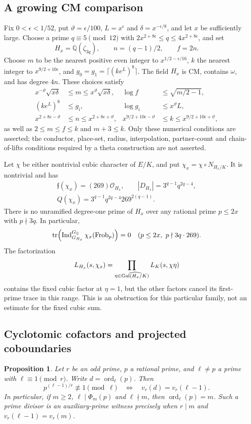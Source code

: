 \documentclass[11pt]{article}
\newtheorem{proposition}[theorem]{Proposition}
\theoremstyle{remark}\newtheorem{remark}[theorem]{Remark}
\newcommand{\Q}{\mathbb Q}\newcommand{\Z}{\mathbb Z}\newcommand{\C}{\mathbb C}
\begin{document}
\subsection*{A growing CM comparison}
Fix $0<\epsilon<1/52$, put $\vartheta=\epsilon/100$,
$L=x^\epsilon$ and $\delta=x^{-\epsilon/8}$, and let $x$ be
sufficiently large. Choose a prime
$q\equiv5\pmod {12}$ with
$2x^{2+8\epsilon}\le q\le4x^{2+8\epsilon}$, and set
\[
 H_x=\Q(\zeta_{3q}),\qquad n=(q-1)/2,\qquad f=2n.
\]
Choose $m$ to be the nearest positive even integer to
$x^{1/2-\epsilon/16}$, $k$ the nearest integer to
$x^{9/2+10\epsilon}$, and $g_0=g_1=\lceil(ke^L)^8\rceil$.
The field $H_x$ is CM, contains $\omega$, and has degree $4n$.
These choices satisfy
\begin{align*}
 x^{-\vartheta}\sqrt{x\delta}&\le m\le x^\vartheta\sqrt{x\delta},&
 \log f&\le\sqrt{m/2-1},\\
 (ke^L)^8&\le g_i,&\log g_i&\le x^\vartheta L,\\
 x^{2+8\epsilon-\vartheta}&\le n\le x^{2+8\epsilon+\vartheta},&
 x^{9/2+10\epsilon-\vartheta}&\le k\le x^{9/2+10\epsilon+\vartheta},
\end{align*}
as well as $2\le m\le f\le k$ and $m+3\le k$.
Only these numerical conditions are asserted; the conductor,
place-set, radius, interpolation, partner-count and chain-of-lifts
conditions required by a theta construction are not asserted.

Let $\chi$ be either nontrivial cubic character of $E/K$, and put
$\chi_x=\chi\circ N_{H_x/K}$. It is nontrivial and has
\[
 \begin{gathered}
 \mathfrak f(\chi_x)=(269)\mathcal O_{H_x},\qquad
 |D_{H_x}|=3^{q-1}q^{2q-4},\\
 Q(\chi_x)=3^{q-1}q^{2q-4}269^{2(q-1)}.
 \end{gathered}
\]
There is no unramified degree-one prime of $H_x$ over any rational
prime $p\le2x$ with $p\nmid3q$. In particular,
\[
 \tr\!\left(\operatorname{Ind}_{G_{H_x}}^{G_\Q}\chi_x
                      (\operatorname{Frob}_p)\right)=0
       \quad(p\le2x,\ p\nmid3q\cdot269).
\]
The factorization
\[
 L_{H_x}(s,\chi_x)
   =\prod_{\eta\in\widehat{\operatorname{Gal}(H_x/K)}}L_K(s,\chi\eta)
\]
contains the fixed cubic factor at $\eta=1$, but the other factors
cancel its first-prime trace in this range. This is an obstruction
for this particular family, not an estimate for the fixed cubic sum.

\subsection*{Cyclotomic cofactors and projected coboundaries}
\begin{proposition}\label{prop:cofactor-prime}
Let $r$ be an odd prime, $p$ a rational prime, and $\ell\ne p$ a prime with $\ell\equiv1\pmod r$. Write $d=\operatorname{ord}_\ell(p)$. Then
\[
 p^{(\ell-1)/r}\not\equiv1\pmod\ell
 \quad\Longleftrightarrow\quad
 v_r(d)=v_r(\ell-1).
\]
In particular, if $m\ge2$, $\ell\mid\Phi_m(p)$ and $\ell\nmid m$, then $\operatorname{ord}_\ell(p)=m$. Such a prime divisor is an auxiliary-prime witness precisely when $r\mid m$ and $v_r(\ell-1)=v_r(m)$.
\end{proposition}
\end{document}
